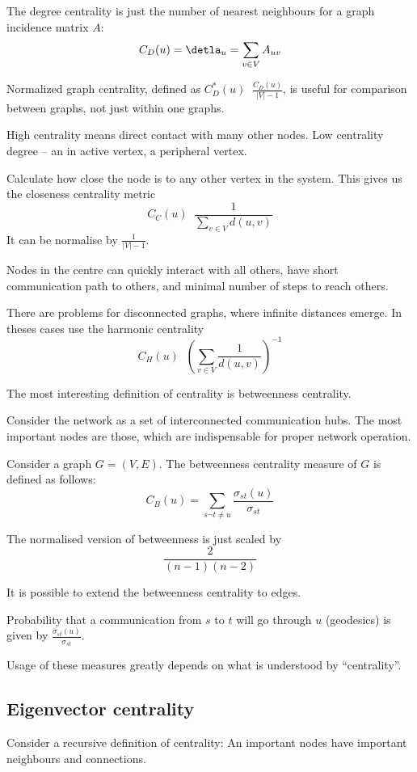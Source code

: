 \documentclass[a4paper]{article}
\newcommand{\brac}[1]{{\left ( #1 \right )}}
\newcommand{\abs}[1]{{\left | #1 \right |}}
\newcommand{\defn}{\mathop{\overset{\Delta}{=}}\nolimits}
\begin{document}
The degree centrality is just the number of nearest neighbours for a graph incidence matrix $A$:
\[C_D(u) = \detla_u = \sum_{v\in V} A_{uv}\]

Normalized graph centrality, defined as $C_D^*(u) \defn \frac{C_D(u)}{\abs{V}-1}$, is useful for comparison between graphs, not just within one graphs.

High centrality means direct contact with many other nodes. Low centrality degree -- an in active vertex, a peripheral vertex.

Calculate how close the node is to any other vertex in the system. This gives us the closeness centrality metric
\[C_C(u) \defn \frac{1}{\sum_{v\in V} d(u,v)}\]
It can be normalise by $\tfrac{1}{\abs{V}-1}$.

Nodes in the centre can quickly interact with all others, have short communication path to others, and minimal number of steps to reach others.

There are problems for disconnected graphs, where infinite distances emerge. In theses cases use the harmonic centrality
\[C_H(u)\defn \brac{\sum_{v\in V} \frac{1}{d(u,v)}}^{-1}\]

The most interesting definition of centrality is betweenness centrality.

Consider the network as a set of interconnected communication hubs. The most important nodes are those, which are indispensable for proper network operation. 

Consider a graph $G = \brac{V,E}$.
The betweenness centrality measure of $G$ is defined as follows:
\[C_B(u) = \sum_{s\neg t\neq u}\frac{\sigma_{st}(u)}{\sigma_{st}}\] 

The normalised version of betweenness is just scaled by
\[\frac{2}{(n-1)(n-2)}\]

It is possible to extend the betweenness centrality to edges.

Probability that a communication from $s$ to $t$ will go through $u$ (geodesics) is given by $\frac{\sigma_{st}(u)}{\sigma_{st}}$.

Usage of these measures greatly depends on what is understood by ``centrality''.

\subsection{Eigenvector centrality} %
\label{sub:eigenvector_centrality}

Consider a recursive definition of centrality: An important nodes have important neighbours and connections.
\end{document}
